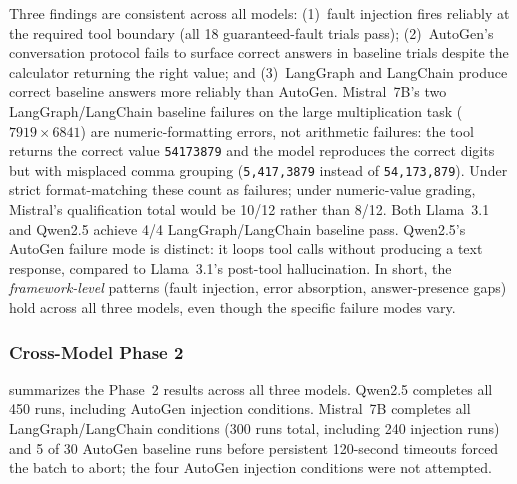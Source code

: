 \documentclass[make,article,submit,moreauthors,pdftex]{mdpi}
\begin{document}
{\color{green!50!black}Three findings are consistent across all models: (1)~fault injection fires reliably at the required tool boundary (all 18 guaranteed-fault trials pass); (2)~AutoGen's conversation protocol fails to surface correct answers in baseline trials despite the calculator returning the right value; and (3)~LangGraph and LangChain produce correct baseline answers more reliably than AutoGen. Mistral~7B's two LangGraph/LangChain baseline failures on the large multiplication task ($7919 \times 6841$) are numeric-formatting errors, not arithmetic failures: the tool returns the correct value \texttt{54173879} and the model reproduces the correct digits but with misplaced comma grouping (\texttt{5,417,3879} instead of \texttt{54,173,879}). Under strict format-matching these count as failures; under numeric-value grading, Mistral's qualification total would be 10/12 rather than 8/12. Both Llama~3.1 and Qwen2.5 achieve 4/4 LangGraph/LangChain baseline pass. Qwen2.5's AutoGen failure mode is distinct: it loops tool calls without producing a text response, compared to Llama~3.1's post-tool hallucination. In short, the \emph{framework-level} patterns (fault injection, error absorption, answer-presence gaps) hold across all three models, even though the specific failure modes vary.}

\subsubsection{Cross-Model Phase 2}\label{sec:cross-model-phase2}

{\color{green!50!black} summarizes the Phase~2 results across all three models. Qwen2.5 completes all 450 runs, including AutoGen injection conditions. Mistral~7B completes all LangGraph/LangChain conditions (300 runs total, including 240 injection runs) and 5 of 30 AutoGen baseline runs before persistent 120-second timeouts forced the batch to abort; the four AutoGen injection conditions were not attempted.}
\end{document}
